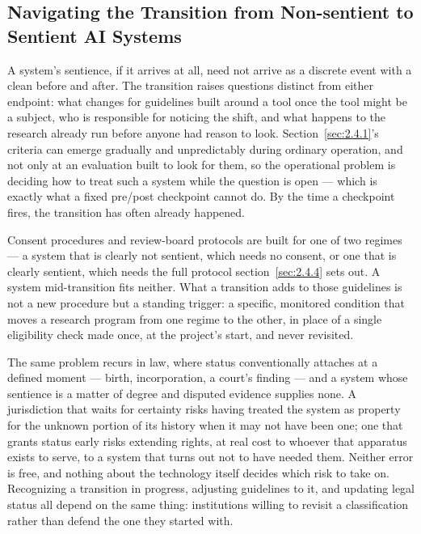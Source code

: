 \subsection{Navigating the Transition from Non-sentient to Sentient AI Systems}
\label{sec:2.4.7}
A system's sentience, if it arrives at all, need not arrive as a discrete event with a clean before and after. The transition raises questions distinct from either endpoint: what changes for guidelines built around a tool once the tool might be a subject, who is responsible for noticing the shift, and what happens to the research already run before anyone had reason to look. Section~\ref{sec:2.4.1}'s criteria can emerge gradually and unpredictably during ordinary operation, and not only at an evaluation built to look for them, so the operational problem is deciding how to treat such a system while the question is open — which is exactly what a fixed pre/post checkpoint cannot do. By the time a checkpoint fires, the transition has often already happened.

Consent procedures and review-board protocols are built for one of two regimes — a system that is clearly not sentient, which needs no consent, or one that is clearly sentient, which needs the full protocol section~\ref{sec:2.4.4} sets out. A system mid-transition fits neither. What a transition adds to those guidelines is not a new procedure but a standing trigger: a specific, monitored condition that moves a research program from one regime to the other, in place of a single eligibility check made once, at the project's start, and never revisited.

The same problem recurs in law, where status conventionally attaches at a defined moment — birth, incorporation, a court's finding — and a system whose sentience is a matter of degree and disputed evidence supplies none. A jurisdiction that waits for certainty risks having treated the system as property for the unknown portion of its history when it may not have been one; one that grants status early risks extending rights, at real cost to whoever that apparatus exists to serve, to a system that turns out not to have needed them. Neither error is free, and nothing about the technology itself decides which risk to take on. Recognizing a transition in progress, adjusting guidelines to it, and updating legal status all depend on the same thing: institutions willing to revisit a classification rather than defend the one they started with.
